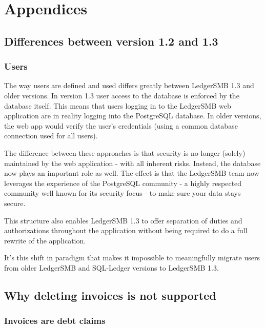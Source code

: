 


\part{Appendices}
\label{part-appendices}

\appendix

\chapter{Differences between version 1.2 and 1.3}
\label{app-differences-12-13}

\section{Users}
\label{sec-diff12-13-users}

The way users are defined and used differs greatly between LedgerSMB 1.3 and
older versions. In version 1.3 user access to the database is enforced by the
database itself. This means that users logging in to the LedgerSMB web application
are in reality logging into the PostgreSQL database. In older versions, the web
app would verify the user's credentials (using a common database connection used
for all users).

The difference between these approaches is that security is no longer (solely)
maintained by the web application - with all inherent risks. Instead, the database
now plays an important role as well. The effect is that the LedgerSMB team now
leverages the experience of the PostgreSQL community - a highly respected community
well known for its security focus - to make sure your data stays secure.

This structure also enables LedgerSMB 1.3 to offer separation of duties and
authorizations throughout the application without being required to do a full
rewrite of the application.

It's this shift in paradigm that makes it impossible to meaningfully migrate
users from older LedgerSMB and SQL-Ledger versions to LedgerSMB 1.3.


\chapter{Why deleting invoices is not supported}
\label{app-no-invoice-deletion}

\section{Invoices are debt claims}
\label{sec-no-invoices-deletion-claims}

